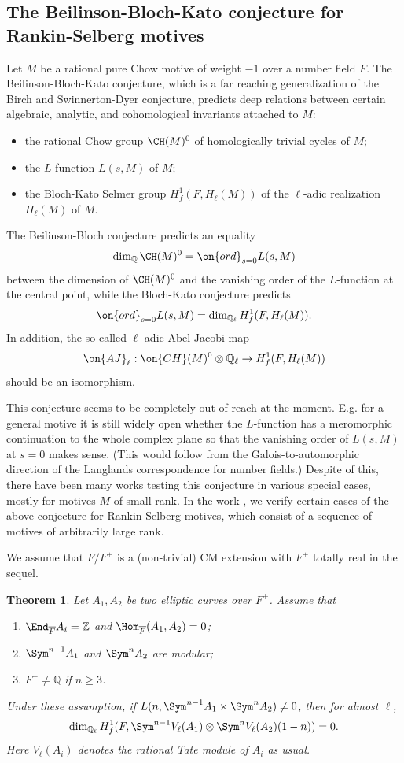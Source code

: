 \documentclass[11pt]{amsart}
\newtheorem{thm}{Theorem}[subsection]
\theoremstyle{definition}
\theoremstyle{definition}
\theoremstyle{definition}
\numberwithin{equation}{section}
\newcommand{\bQ}{{\mathbb Q}}
\newcommand{\bZ}{{\mathbb Z}}
\begin{document}
\subsection{The Beilinson-Bloch-Kato conjecture for Rankin-Selberg motives}\label{S: BBK}
Let $M$ be a rational pure Chow motive of weight $-1$ over a number field $F$. The Beilinson-Bloch-Kato conjecture, which is a far reaching generalization of the Birch and Swinnerton-Dyer conjecture, predicts deep relations between certain  algebraic, analytic, and cohomological invariants attached to $M$:
\begin{itemize}
\item the rational Chow group $\CH(M)^0$ of homologically trivial cycles of $M$;
\item the $L$-function  $L(s,M)$ of $M$;
\item the Bloch-Kato Selmer group $H^1_f(F, H_{\ell}(M))$ of the $\ell$-adic realization $H_{\ell}(M)$ of $M$. 
\end{itemize}
The Beilinson-Bloch conjecture predicts an equality 
\[
\dim_{\bQ}\CH(M)^0 = \on{ord}_{s=0}L(s,M)
\] 
between the dimension of $\CH(M)^0$ and the vanishing order of the $L$-function at the central point, while the Bloch-Kato conjecture predicts 
\[
\on{ord}_{s=0}L(s,M)= \dim_{\bQ_\ell} H^1_f(F, H_{\ell}(M)).
\] 
In addition, the so-called $\ell$-adic Abel-Jacobi map
\[
\on{AJ}_\ell: \on{CH}(M)^0\otimes \bQ_\ell\to H^1_f(F, H_{\ell}(M))
\] 
should be an isomorphism.

This conjecture seems to be completely out of reach at the moment. E.g. for a general motive it is still widely open whether the $L$-function has a meromorphic continuation to the whole complex plane so that the vanishing order of $L(s,M)$ at $s=0$ makes sense. (This would follow from the Galois-to-automorphic direction of the Langlands correspondence for number fields.) Despite of this, there have been many works testing this conjecture in various special cases, mostly for motives $M$ of small rank.
In the work \cite{LTXZZ-BBK}, we verify certain cases of the above conjecture for Rankin-Selberg motives, which consist of a sequence of motives of arbitrarily large rank. 

We assume that $F/F^+$ is a (non-trivial) CM extension with $F^+$ totally real in the sequel. 
\begin{thm}\label{RS-Sym-Elliptic}
Let $A_1,A_2$ be two elliptic curves over $F^+$. Assume that
\begin{enumerate}
\item\label{RS-Sym-Elliptic-1} $\End_{\overline F}A_i=\bZ$ and $\Hom_{\overline F}(A_1,A_2)=0$;
\item\label{RS-Sym-Elliptic-2} $\Sym^{n-1}A_1$ and $\Sym^nA_2$ are modular;
\item\label{RS-Sym-Elliptic-3} $F^+\neq \bQ$ if $n\geq 3$.
\end{enumerate}
Under these assumption, if $L(n, \Sym^{n-1}A_1\times \Sym^nA_2)\neq 0$, then for almost $\ell$, 
\[
\dim_{\bQ_\ell} H^1_f(F,  \Sym^{n-1}V_\ell(A_1)\otimes\Sym^nV_\ell(A_2)(1-n))=0.
\]
Here $V_\ell(A_i)$ denotes the rational Tate module of $A_i$ as usual.
\end{thm}
\end{document}
